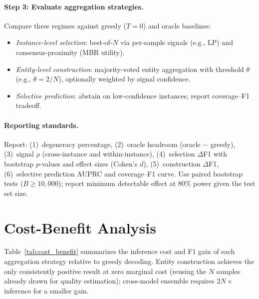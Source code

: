 \paragraph{Step 3: Evaluate aggregation strategies.}
Compare three regimes against greedy ($T{=}0$) and oracle baselines:
\begin{itemize}
    \item \textit{Instance-level selection}: best-of-$N$ via per-sample signals (e.g., LP) and consensus-proximity (MBR utility).
    \item \textit{Entity-level construction}: majority-voted entity aggregation with threshold $\theta$ (e.g., $\theta{=}2/N$), optionally weighted by signal confidence.
    \item \textit{Selective prediction}: abstain on low-confidence instances; report coverage--F1 tradeoff.
\end{itemize}

\paragraph{Reporting standards.}
Report: (1)~degeneracy percentage, (2)~oracle headroom (oracle $-$ greedy), (3)~signal $\rho$ (cross-instance and within-instance), (4)~selection $\Delta$F1 with bootstrap $p$-values and effect sizes (Cohen's $d$), (5)~construction $\Delta$F1, (6)~selective prediction AUPRC and coverage--F1 curve.
Use paired bootstrap tests ($B{\geq}10{,}000$); report minimum detectable effect at 80\% power given the test set size.

\section{Cost-Benefit Analysis}\label{app:cost_benefit}

Table~\ref{tab:cost_benefit} summarizes the inference cost and F1 gain of each aggregation strategy relative to greedy decoding.
Entity construction achieves the only consistently positive result at zero marginal cost (reusing the $N$ samples already drawn for quality estimation); cross-model ensemble requires $2N{\times}$ inference for a smaller gain.

